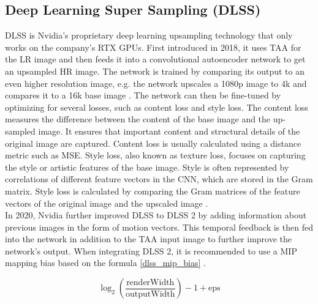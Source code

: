 \documentclass[letterpaper, 10 pt, conference]{ieeeconf}  %
\begin{document}
\subsection{Deep Learning Super Sampling (DLSS)}

DLSS is Nvidia's proprietary deep learning upsampling technology that only works on the company's RTX GPUs.
First introduced in 2018, it uses TAA for the LR image and then feeds it into a convolutional autoencoder network to get an upsampled HR image.
The network is trained by comparing its output to an even higher resolution image, e.g. the network upscales a 1080p image to 4k and compares it to a 16k base image \cite{dlss_slide_1}.
The network can then be fine-tuned by optimizing for several losses, such as content loss and style loss.
The content loss measures the difference between the content of the base image and the up-sampled image.
It ensures that important content and structural details of the original image are captured.
Content loss is usually calculated using a distance metric such as MSE.
Style loss, also known as texture loss, focuses on capturing the style or artistic features of the base image.
Style is often represented by correlations of different feature vectors in the CNN, which are stored in the Gram matrix.
Style loss is calculated by comparing the Gram matrices of the feature vectors of the original image and the upscaled image \cite{liu2021variational}.\\
In 2020, Nvidia further improved DLSS to DLSS 2 by adding information about previous images in the form of motion vectors. 
This temporal feedback is then fed into the network in addition to the TAA input image to further improve the network's output.
When integrating DLSS 2, it is recommended to use a MIP mapping bias based on the formula \ref{dlss_mip_bias} \cite{dlss_slide_2}.

\begin{equation}
    \log_2\left(\frac{\text{{renderWidth}}}{\text{{outputWidth}}}\right) - 1 + \text{{eps}}
    \label{dlss_mip_bias}
\end{equation}
\end{document}
